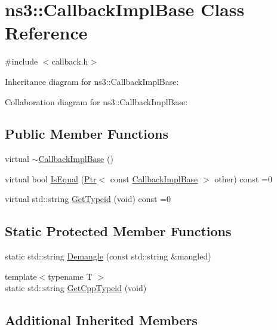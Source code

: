 \hypertarget{classns3_1_1CallbackImplBase}{}\section{ns3\+:\+:Callback\+Impl\+Base Class Reference}
\label{classns3_1_1CallbackImplBase}


{\ttfamily \#include $<$callback.\+h$>$}



Inheritance diagram for ns3\+:\+:Callback\+Impl\+Base\+:


Collaboration diagram for ns3\+:\+:Callback\+Impl\+Base\+:
\subsection*{Public Member Functions}
\begin{DoxyCompactItemize}
\item 
virtual \hyperlink{classns3_1_1CallbackImplBase_a43148caf50219ca491bcaece2686dbf5}{$\sim$\+Callback\+Impl\+Base} ()
\item 
virtual bool \hyperlink{classns3_1_1CallbackImplBase_a199cb5c6bdf18e897bfcd59dfecde061}{Is\+Equal} (\hyperlink{classns3_1_1Ptr}{Ptr}$<$ const \hyperlink{classns3_1_1CallbackImplBase}{Callback\+Impl\+Base} $>$ other) const =0
\item 
virtual std\+::string \hyperlink{classns3_1_1CallbackImplBase_a4bcb671351ea1513bb886b88a139ff90}{Get\+Typeid} (void) const =0
\end{DoxyCompactItemize}
\subsection*{Static Protected Member Functions}
\begin{DoxyCompactItemize}
\item 
static std\+::string \hyperlink{classns3_1_1CallbackImplBase_ab5732cee08181631fff6e90e0c14cdb6}{Demangle} (const std\+::string \&mangled)
\item 
{\footnotesize template$<$typename T $>$ }\\static std\+::string \hyperlink{classns3_1_1CallbackImplBase_a391fcfe022ac1970d2a4058130a9b832}{Get\+Cpp\+Typeid} (void)
\end{DoxyCompactItemize}
\subsection*{Additional Inherited Members}


